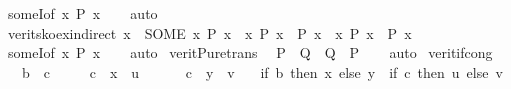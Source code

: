 \begin{isabellebody}
\isamarkupfalse%
\ someI{\isacharbrackleft}{\kern0pt}of\ {\isacartoucheopen}{\isasymlambda}x{\isachardot}{\kern0pt}\ P\ x{\isacartoucheclose}{\isacharbrackright}{\kern0pt}\isanewline
\ \ \isamarkupfalse%
\ auto%
\endisatagproof
{\isafoldproof}%
%
\isadelimproof
\isanewline
%
\endisadelimproof
\isanewline
{}\isamarkupfalse%
\ verit{\isacharunderscore}{\kern0pt}sko{\isacharunderscore}{\kern0pt}ex{\isacharunderscore}{\kern0pt}indirect{}{\isacharcolon}{\kern0pt}\ {\isacartoucheopen}x\ {\isacharequal}{\kern0pt}\ {\isacharparenleft}{\kern0pt}SOME\ x{\isachardot}{\kern0pt}\ P\ x{\isacharparenright}{\kern0pt}\ {\isasymLongrightarrow}\ {\isacharparenleft}{\kern0pt}{\isasymAnd}x{\isachardot}{\kern0pt}\ P\ x\ {\isacharequal}{\kern0pt}\ P{\isacharprime}{\kern0pt}\ x{\isacharparenright}{\kern0pt}\ {\isasymLongrightarrow}\ {\isacharparenleft}{\kern0pt}{\isasymexists}x{\isachardot}{\kern0pt}\ P{\isacharprime}{\kern0pt}\ x{\isacharparenright}{\kern0pt}\ {\isasymlongleftrightarrow}\ P\ x{\isacartoucheclose}\isanewline
%
\isadelimproof
\ \ %
\endisadelimproof
%
\isatagproof
{}\isamarkupfalse%
\ someI{\isacharbrackleft}{\kern0pt}of\ {\isacartoucheopen}{\isasymlambda}x{\isachardot}{\kern0pt}\ P\ x{\isacartoucheclose}{\isacharbrackright}{\kern0pt}\isanewline
\ \ \isamarkupfalse%
\ auto%
\endisatagproof
{\isafoldproof}%
%
\isadelimproof
\isanewline
%
\endisadelimproof
\isanewline
{}\isamarkupfalse%
\ verit{\isacharunderscore}{\kern0pt}Pure{\isacharunderscore}{\kern0pt}trans{\isacharcolon}{\kern0pt}\isanewline
\ \ {\isacartoucheopen}P\ {\isasymequiv}\ Q\ {\isasymLongrightarrow}\ Q\ {\isasymLongrightarrow}\ P{\isacartoucheclose}\isanewline
%
\isadelimproof
\ \ %
\endisadelimproof
%
\isatagproof
{}\isamarkupfalse%
\ auto%
\endisatagproof
{\isafoldproof}%
%
\isadelimproof
\isanewline
%
\endisadelimproof
\isanewline
{}\isamarkupfalse%
\ verit{\isacharunderscore}{\kern0pt}if{\isacharunderscore}{\kern0pt}cong{\isacharcolon}{\kern0pt}\isanewline
\ \ \ {\isacartoucheopen}b\ {\isasymequiv}\ c{\isacartoucheclose}\isanewline
\ \ \ \ \ {\isacartoucheopen}c\ {\isasymLongrightarrow}\ x\ {\isasymequiv}\ u{\isacartoucheclose}\isanewline
\ \ \ \ \ {\isacartoucheopen}{\isasymnot}\ c\ {\isasymLongrightarrow}\ y\ {\isasymequiv}\ v{\isacartoucheclose}\isanewline
\ \ \ {\isacartoucheopen}{\isacharparenleft}{\kern0pt}if\ b\ then\ x\ else\ y{\isacharparenright}{\kern0pt}\ {\isasymequiv}\ {\isacharparenleft}{\kern0pt}if\ c\ then\ u\ else\ v{\isacharparenright}{\kern0pt}{\isacartoucheclose}\isanewline

\end{isabellebody}
